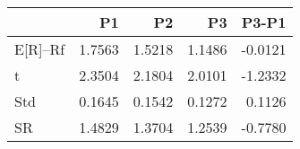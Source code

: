 \begin{tabular}{lrrrr}
\toprule
 & P1 & P2 & P3 & P3-P1 \\
\midrule
E[R]--Rf & 1.7563 & 1.5218 & 1.1486 & -0.0121 \\
t & 2.3504 & 2.1804 & 2.0101 & -1.2332 \\
Std & 0.1645 & 0.1542 & 0.1272 & 0.1126 \\
SR & 1.4829 & 1.3704 & 1.2539 & -0.7780 \\
\bottomrule
\end{tabular}
